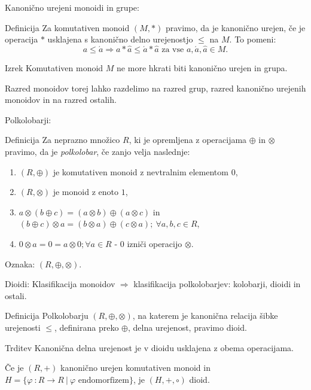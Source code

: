 \documentclass[t, 11pt]{beamer} %
\newcommand{\pojem}[1]{\emph{#1}}
\newcommand{\map}[3]{\ensuremath{{#1}~: {#2} \rightarrow {#3}}}
\newcommand{\fillblack}[1]{
\begin{tikzpicture}[remember picture, overlay]
    \node [shift={(0 cm,0cm)}]  at (current page.south west)
        {%
        \begin{tikzpicture}[remember picture, overlay] at (current page.south west)
            \draw [fill=black] (0, 0) -- (0,#1 \paperheight) --
                              (\paperwidth,#1 \paperheight) -- (\paperwidth,0) -- cycle ;
        \end{tikzpicture}
        };
        \draw (current page.north west) rectangle (current page.south east);
\end{tikzpicture}
}
\begin{document}
\begin{frame}{Kanonično urejeni monoidi in grupe:}
	\begin{block}{Definicija}
		Za komutativen monoid $(M, \ast)$ pravimo, da je kanonično urejen, če je operacija $\ast$ usklajena s kanonično delno urejenostjo $\leq$ na $M$. To pomeni: $$ a \leq \acute{a} \Rightarrow a \ast \hat{a} \leq \acute{a} \ast \hat{a} \text{~za vse~} a, \acute{a},\hat{a}\in M.$$
	\end{block}
\begin{block}{Izrek}
	Komutativen monoid $M$ ne more hkrati biti kanonično urejen in grupa.
\end{block}
Razred monoidov torej lahko razdelimo na razred grup, razred kanonično urejenih monoidov in na razred ostalih.
\end{frame}

\begin{frame}{Polkolobarji:}
	
	\begin{block}{Definicija}
	Za neprazno množico $R$, ki je opremljena z operacijama $\oplus$ in $\otimes$ pravimo, da je \pojem{polkolobar}, če zanjo velja naslednje:
		\begin{enumerate}
			\item $(R, \oplus)$ je komutativen monoid z nevtralnim elementom $0$,
			\item $(R, \otimes)$ je monoid z enoto $1$,
			\item $a\otimes(b \oplus c) = (a\otimes b) \oplus (a\otimes c)$ in $(b \oplus c)\otimes a = (b\otimes a) \oplus (c\otimes a);~\forall a, b, c\in R$,
			\item $0 \otimes a = 0 = a\otimes 0; \forall a\in R$ - $0$ izniči operacijo $\otimes$.
		\end{enumerate}
	Oznaka: $(R, \oplus, \otimes)$.
	\end{block}

\end{frame}

\begin{frame}{Dioidi:}
	Klasifikacija monoidov $\Rightarrow$ klasifikacija polkolobarjev: kolobarji, dioidi in ostali.
	\begin{block}{Definicija}
		Polkolobarju $(R, \oplus, \otimes)$, na katerem je kanonična relacija šibke urejenosti $\leq$, definirana preko $\oplus$, delna urejenost, pravimo dioid.
	\end{block}
\begin{block}{Trditev}
	Kanonična delna urejenost je v dioidu usklajena z obema operacijama.
\end{block}
Če je $(R, +)$ kanonično urejen komutativen monoid in $H = \{ \map{\varphi}{R}{R}~|~\varphi \text{~endomorfizem}\}$, je $(H, +, \circ)$ dioid.
\end{frame}
\end{document}
